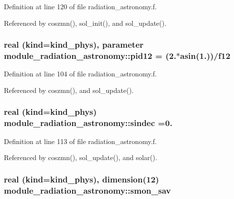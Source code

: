Definition at line 120 of file radiation\+\_\+astronomy.\+f.



Referenced by coszmn(), sol\+\_\+init(), and sol\+\_\+update().

\subsubsection[{\texorpdfstring{pid12}{pid12}}]{\setlength{\rightskip}{0pt plus 5cm}real (kind=kind\+\_\+phys), parameter module\+\_\+radiation\+\_\+astronomy\+::pid12 = (2.$\ast$asin(1.))/f12\hspace{0.3cm}{\ttfamily [private]}}\hypertarget{group__module__radiation__astronomy_gadbf9cdfc7b55d882f015a4bc4ef276ab}{}\label{group__module__radiation__astronomy_gadbf9cdfc7b55d882f015a4bc4ef276ab}


Definition at line 104 of file radiation\+\_\+astronomy.\+f.



Referenced by coszmn(), and sol\+\_\+update().

\subsubsection[{\texorpdfstring{sindec}{sindec}}]{\setlength{\rightskip}{0pt plus 5cm}real (kind=kind\+\_\+phys) module\+\_\+radiation\+\_\+astronomy\+::sindec =0.\hspace{0.3cm}{\ttfamily [private]}}\hypertarget{group__module__radiation__astronomy_gae195d9c834e2789170f89c988d28b01e}{}\label{group__module__radiation__astronomy_gae195d9c834e2789170f89c988d28b01e}


Definition at line 113 of file radiation\+\_\+astronomy.\+f.



Referenced by coszmn(), sol\+\_\+update(), and solar().

\subsubsection[{\texorpdfstring{smon\+\_\+sav}{smon_sav}}]{\setlength{\rightskip}{0pt plus 5cm}real (kind=kind\+\_\+phys), dimension(12) module\+\_\+radiation\+\_\+astronomy\+::smon\+\_\+sav\hspace{0.3cm}{\ttfamily [private]}}\hypertarget{group__module__radiation__astronomy_gab68b4488022a4c6340cb60dca3feff6a}{}\label{group__module__radiation__astronomy_gab68b4488022a4c6340cb60dca3feff6a}


